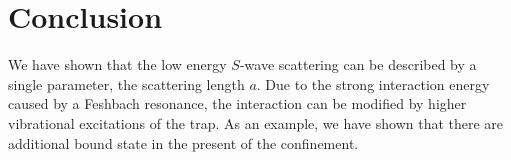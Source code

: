 \documentclass[aps,twocolumn,secnumarabic,balancelastpage,amsmath,amssymb,nofootinbib]{revtex4}
\begin{document}
\section{Conclusion}
We have shown that the low energy $S$-wave scattering can be described by a single parameter, the scattering length $a$. Due to the strong interaction energy caused by a Feshbach resonance, the interaction can be modified by higher vibrational excitations of the trap. As an example, we have shown that there are additional bound state in the present of the confinement.


\end{document}
